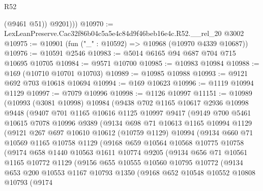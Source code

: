 \begin{lexlean}{R52}
\begin{coremodule}
            (@9461 @51))
          @9201)))
@10970 := LexLeanPreserve.Cac32f86b04c5a5e4c84d9f46beb16e4c.R52.__rel_20 @3002
@10975 := @10901 (fun ("_" : @10592) => @10968 (@10970 @4339 @10687))
@10976 := @10591 @2546
@10983 := @5014 @6165 @94 @687 @704 @715 @10695 @10705
@10984 := @9571 @10700
@10985 := @10983 @10984
@10988 := @169 (@10710 @10701 @10703)
@10989 := @10985 @10988
@10993 := @9121 @692 @703 @10618 @10694
@10994 := @169 @10623
@10996 := @1119 @10994 @1129
@10997 := @7079 @10996
@10998 := @1126 @10997
@11151 := @10989
    (@10993
      (@3081 @10998)
      @10984
      (@9438
        @702
        @1165
        @10617
        @2936
        @10998
        @9448
        (@9407
          @701
          @1165
          @10616
          @1125
          @10997
          @9417
          (@9149
            @700
            @5461
            @10615
            @7078
            @10996
            @9389
            (@9134
              @698
              @71
              @10613
              @1165
              @10994
              @1129
              (@9121
                @267
                @697
                @10610
                @10612
                (@10759 @1129)
                @10994
                (@9134
                  @660
                  @71
                  @10569
                  @1165
                  @10758
                  @1129
                  (@9168
                    @659
                    @10564
                    @10568
                    @10775
                    @10758
                    (@9174
                      @658
                      @1440
                      @10563
                      @1611
                      @10774
                      @9205
                      (@9134
                        @656
                        @71
                        @10561
                        @1165
                        @10772
                        @1129
                        (@9156
                          @655
                          @10555
                          @10560
                          @10795
                          @10772
                          (@9134
                            @653
                            @200
                            @10553
                            @1167
                            @10793
                            @1350
                            (@9168
                              @652
                              @10548
                              @10552
                              @10808
                              @10793
                              (@9174

\end{coremodule}
\end{lexlean}
